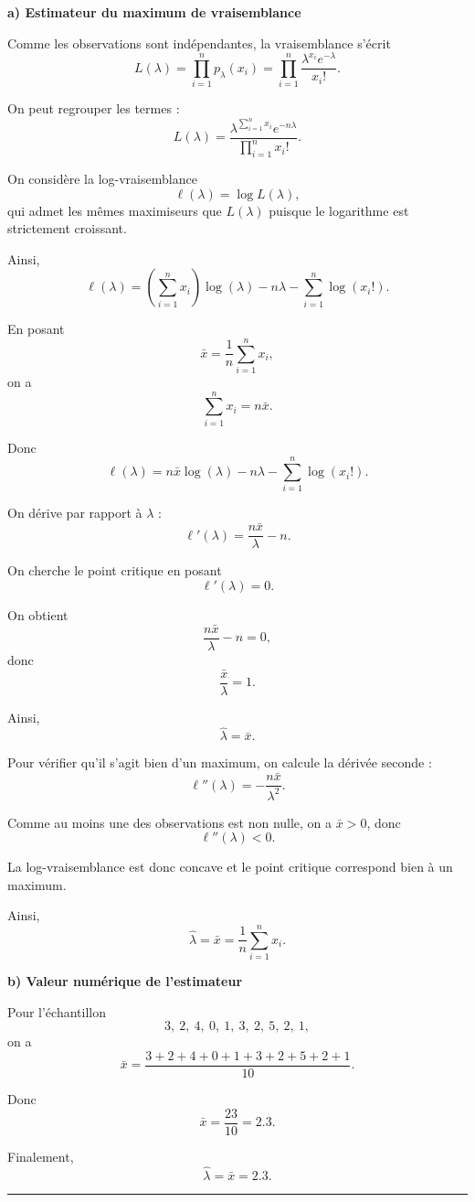 \documentclass{article}
\begin{document}
\textbf{a) Estimateur du maximum de vraisemblance}

Comme les observations sont indépendantes, la vraisemblance s'écrit
\[
L(\lambda)
=
\prod_{i=1}^n p_\lambda(x_i)
=
\prod_{i=1}^n
\frac{\lambda^{x_i}e^{-\lambda}}{x_i!}.
\]

On peut regrouper les termes :
\[
L(\lambda)
=
\frac{
\lambda^{\sum_{i=1}^n x_i}
e^{-n\lambda}
}{
\prod_{i=1}^n x_i!
}.
\]

On considère la log-vraisemblance
\[
\ell(\lambda)=\log L(\lambda),
\]
qui admet les mêmes maximiseurs que $L(\lambda)$ puisque le logarithme est strictement croissant.

Ainsi,
\[
\ell(\lambda)
=
\left(\sum_{i=1}^n x_i\right)\log(\lambda)
-
n\lambda
-
\sum_{i=1}^n \log(x_i!).
\]

En posant
\[
\bar{x}
=
\frac{1}{n}\sum_{i=1}^n x_i,
\]
on a
\[
\sum_{i=1}^n x_i=n\bar{x}.
\]

Donc
\[
\ell(\lambda)
=
n\bar{x}\log(\lambda)
-
n\lambda
-
\sum_{i=1}^n \log(x_i!).
\]

On dérive par rapport à $\lambda$ :
\[
\ell'(\lambda)
=
\frac{n\bar{x}}{\lambda}
-
n.
\]

On cherche le point critique en posant
\[
\ell'(\lambda)=0.
\]

On obtient
\[
\frac{n\bar{x}}{\lambda}-n=0,
\]
donc
\[
\frac{\bar{x}}{\lambda}=1.
\]

Ainsi,
\[
\hat{\lambda}=\bar{x}.
\]

Pour vérifier qu'il s'agit bien d'un maximum, on calcule la dérivée seconde :
\[
\ell''(\lambda)
=
-\frac{n\bar{x}}{\lambda^2}.
\]

Comme au moins une des observations est non nulle, on a $\bar{x}>0$, donc
\[
\ell''(\lambda)<0.
\]

La log-vraisemblance est donc concave et le point critique correspond bien à un maximum.

Ainsi,
\[
\hat{\lambda}
=
\bar{x}
=
\frac{1}{n}\sum_{i=1}^n x_i.
\]

\bigskip

\textbf{b) Valeur numérique de l'estimateur}

Pour l'échantillon
\[
3,\ 2,\ 4,\ 0,\ 1,\ 3,\ 2,\ 5,\ 2,\ 1,
\]
on a
\[
\bar{x}
=
\frac{3+2+4+0+1+3+2+5+2+1}{10}.
\]

Donc
\[
\bar{x}
=
\frac{23}{10}
=
2.3.
\]

Finalement,
\[
\hat{\lambda}
=
\bar{x}
=
2.3.
\]
\vspace{1cm}
\hrule
\vspace{1cm}
\end{document}
